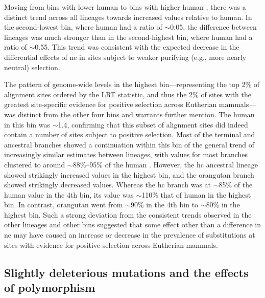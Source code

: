 Moving from bins with lower human \dnds to bins with higher human
\dnds, there was a distinct trend across all lineages towards
increased \dnds values relative to human. In the second-lowest bin,
where human had a \dnds ratio of $\sim$0.05, the \dnds difference
between lineages was much stronger than in the second-highest bin,
where human had a \dnds ratio of $\sim$0.55. This trend was consistent
with the expected decrease in the differential effects of \ac{ne} in
sites subject to weaker purifying (e.g., more nearly neutral)
selection.

The pattern of genome-wide \dnds levels in the highest
bin---representing the top 2\% of alignment sites ordered by the LRT
statistic, and thus the 2\% of sites with the greatest site-specific
evidence for positive selection across Eutherian mammals---was
distinct from the other four bins and warrants further mention. The
human \dnds in this bin was $\sim$1.4, confirming that this subset of
alignment sites did indeed contain a number of sites subject to
positive selection. Most of the terminal and ancestral branches showed
a continuation within this bin of the general trend of increasingly
similar \dnds estimates between lineages, with values for most
branches clustered to around $\sim$88\%--95\% of the human
\dnds. However, the \ac{hc} ancestral lineage showed strikingly
increased \dnds values in the highest bin, and the orangutan branch
showed strikingly decreased values. Whereas the \ac{hc} branch was at
$\sim$85\% of the human value in the 4th bin, its value was
$\sim$110\% that of human in the highest bin. In contrast, orangutan
went from $\sim$90\% in the 4th bin to $\sim$80\% in the highest
bin. Such a strong deviation from the consistent trends observed in
the other lineages and other bins suggested that some effect other
than a difference in \ac{ne} may have caused an increase or decrease
in the prevalence of \nsyn substitutions at sites with evidence for
positive selection across Eutherian mammals.

\subsection{Slightly deleterious mutations and the effects of polymorphism}


